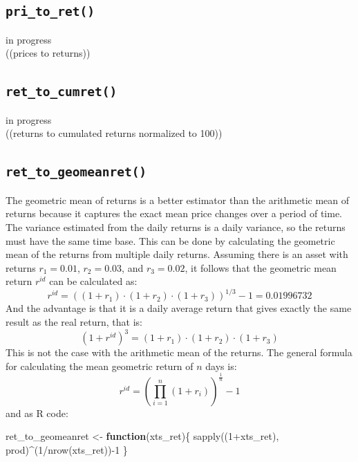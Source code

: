 \documentclass[
  oneside]{book}
\newenvironment{Shaded}{\begin{snugshade}}{\end{snugshade}}
\newcommand{\ControlFlowTok}[1]{\textcolor[rgb]{0.13,0.29,0.53}{\textbf{#1}}}
\newcommand{\DecValTok}[1]{\textcolor[rgb]{0.00,0.00,0.81}{#1}}
\newcommand{\FunctionTok}[1]{\textcolor[rgb]{0.00,0.00,0.00}{#1}}
\newcommand{\NormalTok}[1]{#1}
\newcommand{\OtherTok}[1]{\textcolor[rgb]{0.56,0.35,0.01}{#1}}
\newcommand{\SpecialCharTok}[1]{\textcolor[rgb]{0.00,0.00,0.00}{#1}}
\begin{document}
\hypertarget{pritoret}{%
\subsection{\texorpdfstring{\texttt{pri\_to\_ret()}}{pri\_to\_ret()}}\label{pritoret}}

\textbar\textbar\textbar in progress\textbar\textbar\textbar{}\\
((prices to returns))

\hypertarget{ret_to_cumret}{%
\subsection{\texorpdfstring{\texttt{ret\_to\_cumret()}}{ret\_to\_cumret()}}\label{ret_to_cumret}}

\textbar\textbar\textbar in progress\textbar\textbar\textbar{}\\
((returns to cumulated returns normalized to 100))

\hypertarget{geomeanret}{%
\subsection{\texorpdfstring{\texttt{ret\_to\_geomeanret()}}{ret\_to\_geomeanret()}}\label{geomeanret}}

The geometric mean of returns is a better estimator than the arithmetic mean of returns because it captures the exact mean price changes over a period of time. The variance estimated from the daily returns is a daily variance, so the returns must have the same time base. This can be done by calculating the geometric mean of the returns from multiple daily returns. Assuming there is an asset with returns \(r_1 = 0.01\), \(r_2=0.03\), and \(r_3=0.02\), it follows that the geometric mean return \(r^{id}\) can be calculated as:
\[
  r^{id} = ((1+r_1) \cdot (1+r_2) \cdot (1+r_3))^{1/3}-1 = 0.01996732
\]
And the advantage is that it is a daily average return that gives exactly the same result as the real return, that is:
\[
  (1+r^{id})^3 = (1+r_1) \cdot (1+r_2) \cdot (1+r_3)
\]
This is not the case with the arithmetic mean of the returns. The general formula for calculating the mean geometric return of \(n\) days is:
\[
  r^{id} = (\prod_{i=1}^n (1+r_i))^{\frac{1}{n}}-1
\]
and as R code:

\begin{Shaded}
\begin{Highlighting}[]
\NormalTok{ret\_to\_geomeanret }\OtherTok{\textless{}{-}} \ControlFlowTok{function}\NormalTok{(xts\_ret)\{}
  \FunctionTok{sapply}\NormalTok{((}\DecValTok{1}\SpecialCharTok{+}\NormalTok{xts\_ret), prod)}\SpecialCharTok{\^{}}\NormalTok{(}\DecValTok{1}\SpecialCharTok{/}\FunctionTok{nrow}\NormalTok{(xts\_ret))}\SpecialCharTok{{-}}\DecValTok{1}
\NormalTok{\}}
\end{Highlighting}
\end{Shaded}
\end{document}
